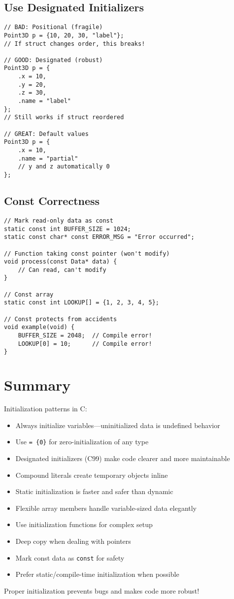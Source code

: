 \subsection{Use Designated Initializers}

\begin{lstlisting}
// BAD: Positional (fragile)
Point3D p = {10, 20, 30, "label"};
// If struct changes order, this breaks!

// GOOD: Designated (robust)
Point3D p = {
    .x = 10,
    .y = 20,
    .z = 30,
    .name = "label"
};
// Still works if struct reordered

// GREAT: Default values
Point3D p = {
    .x = 10,
    .name = "partial"
    // y and z automatically 0
};
\end{lstlisting}

\subsection{Const Correctness}

\begin{lstlisting}
// Mark read-only data as const
static const int BUFFER_SIZE = 1024;
static const char* const ERROR_MSG = "Error occurred";

// Function taking const pointer (won't modify)
void process(const Data* data) {
    // Can read, can't modify
}

// Const array
static const int LOOKUP[] = {1, 2, 3, 4, 5};

// Const protects from accidents
void example(void) {
    BUFFER_SIZE = 2048;  // Compile error!
    LOOKUP[0] = 10;      // Compile error!
}
\end{lstlisting}

\section{Summary}

Initialization patterns in C:

\begin{itemize}
    \item Always initialize variables—uninitialized data is undefined behavior
    \item Use \texttt{= \{0\}} for zero-initialization of any type
    \item Designated initializers (C99) make code clearer and more maintainable
    \item Compound literals create temporary objects inline
    \item Static initialization is faster and safer than dynamic
    \item Flexible array members handle variable-sized data elegantly
    \item Use initialization functions for complex setup
    \item Deep copy when dealing with pointers
    \item Mark const data as \texttt{const} for safety
    \item Prefer static/compile-time initialization when possible
\end{itemize}

Proper initialization prevents bugs and makes code more robust!
